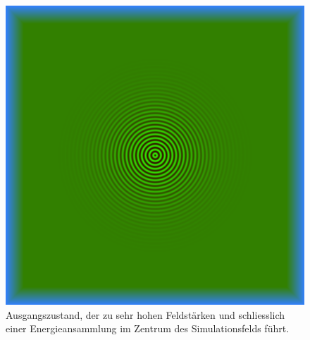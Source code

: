\begin{figure}
    \includegraphics{papers/particles/figures/wavesim/particle_initial_state.png}
    \caption{Ausgangszustand, der zu sehr hohen Feldstärken und schliesslich einer Energieansammlung im Zentrum des Simulationsfelds führt.}\label{particles:fig:partikel:ausgangszustand}
\end{figure}